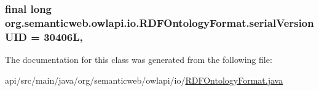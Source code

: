 \hypertarget{classorg_1_1semanticweb_1_1owlapi_1_1io_1_1_r_d_f_ontology_format_ab7f50323268f71597111f93112b9f7d7}{
\subsubsection[{serial\-Version\-U\-I\-D}]{\setlength{\rightskip}{0pt plus 5cm}final long org.\-semanticweb.\-owlapi.\-io.\-R\-D\-F\-Ontology\-Format.\-serial\-Version\-U\-I\-D = 30406\-L\hspace{0.3cm}{\ttfamily [static]}, {\ttfamily [private]}}}\label{classorg_1_1semanticweb_1_1owlapi_1_1io_1_1_r_d_f_ontology_format_ab7f50323268f71597111f93112b9f7d7}


The documentation for this class was generated from the following file\-:\begin{DoxyCompactItemize}
\item 
api/src/main/java/org/semanticweb/owlapi/io/\hyperlink{_r_d_f_ontology_format_8java}{R\-D\-F\-Ontology\-Format.\-java}\end{DoxyCompactItemize}
